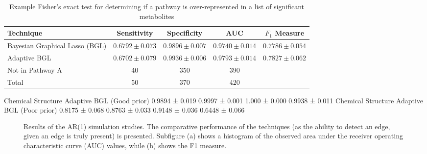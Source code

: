 \begin{table}[h!]
	\caption[Exact test]{Example Fisher's exact test for determining if a pathway is over-represented in a list of significant metabolites \label{tab:pathExact} }
	\begin{center}
		\begin{tabular}{ p{3cm} c c c c }
			\hline
			Technique &	Sensitivity	& Specificity &	AUC &	$F_1$ Measure \\
			\hline 
			Bayesian Graphical Lasso (BGL)	& $0.6792 \pm 0.073$ & $0.9896 \pm 0.007$	& $0.9740 \pm 0.014$	& $0.7786 \pm 0.054$ \\
			Adaptive BGL &	$0.6702  \pm 0.079$	& $0.9936  \pm 0.006$ &	$0.9793  \pm 0.014$ &	$0.7827  \pm 0.062$\\
			\hline
			Not in Pathway A & 40 & 350 &  390 \\
			Total & 50 & 370 & 420\\
			\hline
		\end{tabular}
	\end{center}
\end{table}




Chemical Structure Adaptive BGL (Good prior)	0.9894 ± 0.019	0.9997 ± 0.001	1.000 ± 0.000	0.9938 ± 0.011
Chemical Structure Adaptive BGL (Poor prior)	0.8175 ± 0.068	0.8763 ± 0.033	0.9148 ± 0.036	0.6448 ± 0.066


\begin{figure}[h!]
	\caption[AR(1) Results]{Results of the AR(1) simulation studies. The comparative performance of the techniques (as the ability to detect an edge, given an edge is truly present) is presented. Subfigure (a) shows a histogram of the observed area under the receiver operating characteristic curve (AUC) values, while (b) shows the F1 measure.  \label{fig:ar1res} }
\end{figure}